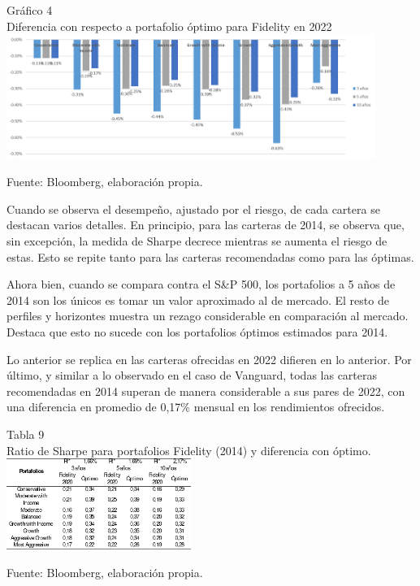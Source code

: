 \documentclass[a4paper,fleqn]{cas-sc}
\begin{document}
\begin{center}
	Gráfico 4\\
	Diferencia con respecto a portafolio óptimo para Fidelity en 2022\\

	\includegraphics[width=0.9\textwidth]{image/imagen4.png}

	\tiny Fuente: Bloomberg, elaboración propia.
\end{center}

Cuando se observa el desempeño, ajustado por el riesgo, de cada cartera se destacan varios detalles. En principio, para las carteras de 2014, se observa que, sin excepción, la medida de Sharpe decrece mientras se aumenta el riesgo de estas. Esto se repite tanto para las carteras recomendadas como para las óptimas. 

Ahora bien, cuando se compara contra el S\&P 500, los portafolios a 5 años de 2014 son los únicos es tomar un valor aproximado al de mercado. El resto de perfiles y horizontes muestra un rezago considerable en comparación al mercado. Destaca que esto no sucede con los portafolios óptimos estimados para 2014. 

Lo anterior se replica en las carteras ofrecidas en 2022 difieren en lo anterior. 
Por último, y similar a lo observado en el caso de Vanguard, todas las carteras recomendadas en 2014 superan de manera considerable a sus pares de 2022, con una diferencia en promedio de 0,17\% mensual en los rendimientos ofrecidos.

\begin{center}
	Tabla 9\\
	Ratio de Sharpe para portafolios Fidelity (2014) y diferencia con óptimo.\\

	\includegraphics[width=0.45\textwidth]{image/tabla9.png}

	\tiny Fuente: Bloomberg, elaboración propia.
\end{center}
\end{document}
